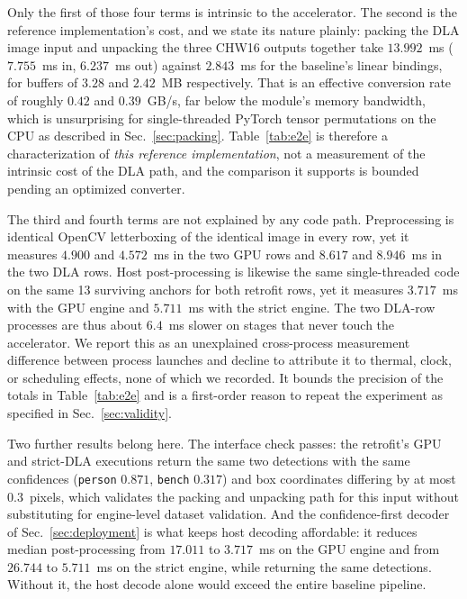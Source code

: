 Only the first of those four terms is intrinsic to the accelerator. The second
is the reference implementation's cost, and we state its nature plainly:
packing the DLA image input and unpacking the three CHW16 outputs together take
$13.992$~ms ($7.755$~ms in, $6.237$~ms out) against $2.843$~ms for the
baseline's linear bindings, for buffers of $3.28$ and $2.42$~MB respectively.
That is an effective conversion rate of roughly $0.42$ and $0.39$~GB/s, far
below the module's memory bandwidth, which is unsurprising for
single-threaded PyTorch tensor permutations on the CPU as described in
Sec.~\ref{sec:packing}. Table~\ref{tab:e2e} is therefore a characterization of
\emph{this reference implementation}, not a measurement of the intrinsic cost of
the DLA path, and the comparison it supports is bounded pending an optimized
converter. 

The third and fourth terms are not explained by any code path. Preprocessing is
identical OpenCV letterboxing of the identical image in every row, yet it
measures $4.900$ and $4.572$~ms in the two GPU rows and $8.617$ and $8.946$~ms
in the two DLA rows. Host post-processing is likewise the same single-threaded
code on the same 13 surviving anchors for both retrofit rows, yet it measures
$3.717$~ms with the GPU engine and $5.711$~ms with the strict engine. The two
DLA-row processes are thus about $6.4$~ms slower on stages that never touch the
accelerator. We report this as an unexplained cross-process measurement
difference between process launches and decline to attribute it to thermal,
clock, or scheduling effects, none of which we recorded. It bounds the precision
of the totals in Table~\ref{tab:e2e} and is a first-order reason to repeat the
experiment as specified in Sec.~\ref{sec:validity}.

Two further results belong here. The interface check passes: the retrofit's GPU
and strict-DLA executions return the same two detections with the same
confidences (\texttt{person} $0.871$, \texttt{bench} $0.317$) and box
coordinates differing by at most $0.3$~pixels, which validates the packing and
unpacking path for this input without substituting for engine-level dataset
validation. And the confidence-first decoder of Sec.~\ref{sec:deployment} is
what keeps host decoding affordable: it reduces median post-processing from
$17.011$ to $3.717$~ms on the GPU engine and from $26.744$ to $5.711$~ms on the
strict engine, while returning the same detections. Without it, the host decode
alone would exceed the entire baseline pipeline.

